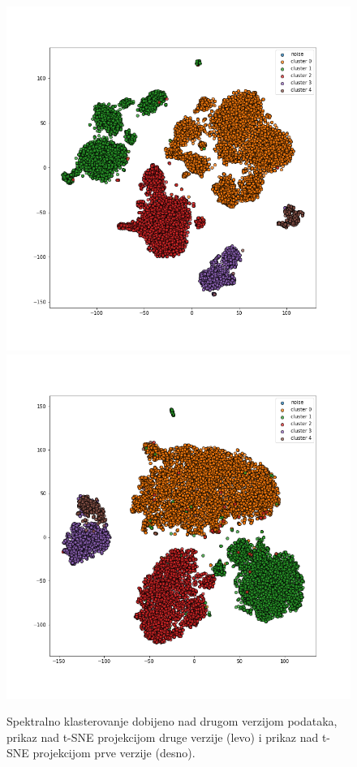 \documentclass[a4paper]{article}
\begin{document}
\begin{figure}[ht]
	\centering
	\includegraphics[scale=0.25]{spektral_v2_5}
	\includegraphics[scale=0.25]{spektral_v2_prikaz_na_v1}
	\caption{Spektralno klasterovanje dobijeno nad drugom verzijom podataka, prikaz nad t-SNE projekcijom druge verzije (levo) i prikaz nad t-SNE projekcijom prve verzije (desno).}
	\label{spektral_v2_prikaz_na_v1}
\end{figure}
\end{document}
